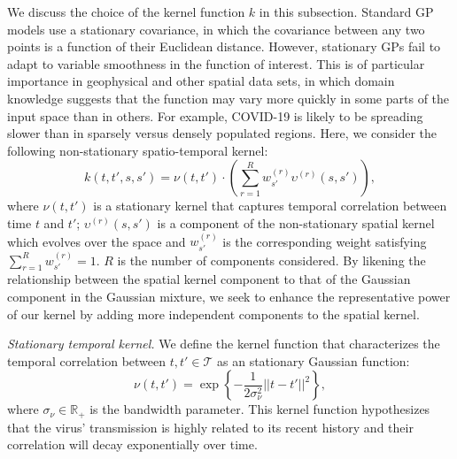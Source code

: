 \documentclass[journal]{IEEEtran}
\begin{document}
We discuss the choice of the kernel function $k$ in this subsection. Standard GP models use a stationary covariance, in which the covariance between any two points is a function of their Euclidean distance. However, stationary GPs fail to adapt to variable smoothness in the function of interest. 
This is of particular importance in geophysical and other spatial data sets, in which domain knowledge suggests that the function may vary more quickly in some parts of the input space than in others.
For example, COVID-19 is likely to be spreading slower than in sparsely versus densely populated regions. Here, we consider the following non-stationary spatio-temporal kernel:
\begin{equation}
    k(t, t', s, s') = \nu(t, t') \cdot \left(\sum_{r=1}^R w^{(r)}_{s'} \upsilon^{(r)}(s, s')\right),
    \label{eq:spatio-temporal-kernel}
\end{equation}
where $\nu(t, t')$ is a stationary kernel that captures temporal correlation between time $t$ and $t'$; $\upsilon^{(r)}(s, s')$ is a component of the non-stationary spatial kernel which evolves over the space and $w^{(r)}_{s'}$ is the corresponding weight satisfying $\sum_{r=1}^R w^{(r)}_{s'} = 1$. $R$ is the number of components considered.
By likening the relationship between the spatial kernel component to that of the Gaussian component in the Gaussian mixture, we seek to enhance the representative power of our kernel by adding more independent components to the spatial kernel.

\vspace{.1in}
\noindent\emph{Stationary temporal kernel.}
We define the kernel function that characterizes the temporal correlation between $t,t' \in \mathscr{T}$ as an stationary Gaussian function: 
\[
\nu(t, t') = \exp\left\{- \frac{1}{2 \sigma_\nu^2} ||t-t'||^2\right\},
\]
where $\sigma_\nu \in \mathbb{R}_+$ is the bandwidth parameter. This kernel function hypothesizes that the virus' transmission is highly related to its recent history and their correlation will decay exponentially over time.
\end{document}
